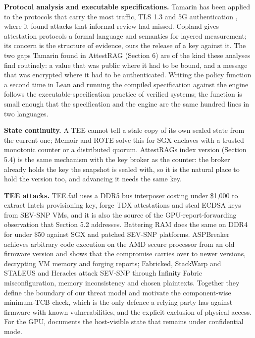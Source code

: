 \documentclass[letterpaper,twocolumn,10pt]{article}
\begin{document}
\textbf{Protocol analysis and executable specifications.} Tamarin \cite{meier2013tamarin} has been applied to the protocols that carry the most traffic, TLS 1.3 \cite{cremers2017tls13} and 5G authentication \cite{basin2018fiveg}, where it found attacks that informal review had missed. Copland \cite{ramsdell2019copland} gives attestation protocols a formal language and semantics for layered measurement; its concern is the structure of evidence, ours the release of a key against it. The two gaps Tamarin found in AttestRAG (Section 6) are of the kind these analyses find routinely: a value that was public where it had to be bound, and a message that was encrypted where it had to be authenticated. Writing the policy function a second time in Lean \cite{demoura2021lean4} and running the compiled specification against the engine follows the executable-specification practice of verified systems; the function is small enough that the specification and the engine are the same hundred lines in two languages.

\textbf{State continuity.} A TEE cannot tell a stale copy of its own sealed state from the current one; Memoir \cite{parno2011memoir} and ROTE \cite{matetic2017rote} solve this for SGX enclaves with a trusted monotonic counter or a distributed quorum. AttestRAG\textquotesingle s index version (Section 5.4) is the same mechanism with the key broker as the counter: the broker already holds the key the snapshot is sealed with, so it is the natural place to hold the version too, and advancing it needs the same key.

\textbf{TEE attacks.} TEE.fail \cite{chuang2025teefail} uses a DDR5 bus interposer costing under \$1,000 to extract Intel\textquotesingle s provisioning key, forge TDX attestations and steal ECDSA keys from SEV-SNP VMs, and it is also the source of the GPU-report-forwarding observation that Section 5.2 addresses. Battering RAM \cite{demeulemeester2026batteringram} does the same on DDR4 for under \$50 against SGX and patched SEV-SNP platforms. ASPBreaker \cite{shen2026aspbreaker} achieves arbitrary code execution on the AMD secure processor from an old firmware version and shows that the compromise carries over to newer versions, decrypting VM memory and forging reports; Fabricked, StackWarp and STALEUS \cite{schlueter2026fabricked,zhang2026stackwarp,schlueter2026staleus} and Heracles \cite{schlueter2025heracles} attack SEV-SNP through Infinity Fabric misconfiguration, memory inconsistency and chosen plaintexts. Together they define the boundary of our threat model and motivate the component-wise minimum-TCB check, which is the only defence a relying party has against firmware with known vulnerabilities, and the explicit exclusion of physical access. For the GPU, \cite{gu2025nvidiacc} documents the host-visible state that remains under confidential mode.
\end{document}
